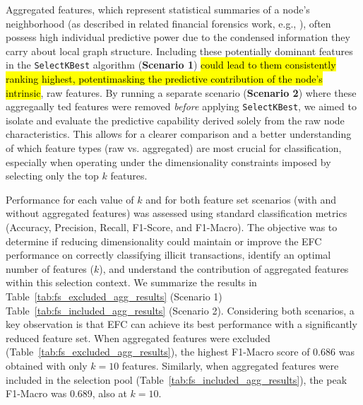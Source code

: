 \documentclass[12pt]{article}
\begin{document}
Aggregated features, which represent statistical summaries of a node's neighborhood (as described in related financial
forensics work, e.g., \cite{weber2019antimoneylaunderingbitcoinexperimenting}), often possess high individual predictive
power due to the condensed information they carry about local graph structure. Including these potentially dominant features
in the \texttt{SelectKBest} algorithm ({\bf Scenario 1}) \hl{could lead to them consistently ranking highest, potentimasking
the predictive contribution of the node's intrinsic}, raw features. By running a separate scenario ({\bf Scenario 2}) where
these aggregaally ted features were removed \textit{before} applying \texttt{SelectKBest}, we aimed to isolate and evaluate
the predictive capability derived solely from the raw node characteristics. This allows for a clearer comparison and a
better understanding of which feature types (raw vs. aggregated) are most crucial for classification, especially when
operating under the dimensionality constraints imposed by selecting only the top $k$ features.

Performance for each value of $k$ and for both feature set scenarios (with and without aggregated features) was assessed
using standard classification metrics (Accuracy, Precision, Recall, F1-Score, and F1-Macro). The objective was to determine
if reducing dimensionality could maintain or improve the EFC performance on correctly classifying illicit transactions,
identify an optimal number of features ($k$), and understand the contribution of aggregated features within this selection
context. We summarize the results in Table~\ref{tab:fs_excluded_agg_results} (Scenario 1) Table~\ref{tab:fs_included_agg_results}
(Scenario 2). Considering both scenarios, a key observation is that EFC can achieve its best performance with a significantly reduced
feature set. When aggregated features were excluded (Table~\ref{tab:fs_excluded_agg_results}), the highest F1-Macro score
of 0.686 was obtained with only $k=10$ features. Similarly, when aggregated features were included in the selection pool
(Table~\ref{tab:fs_included_agg_results}), the peak F1-Macro was 0.689, also at $k=10$.
\end{document}
